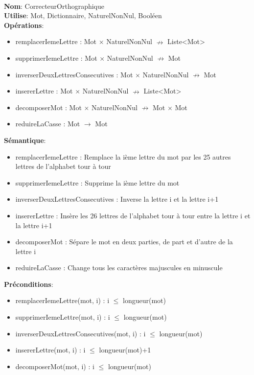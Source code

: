\documentclass{article}
\begin{document}
    \noindent
    \\
    \textbf{Nom}: CorrecteurOrthographique \\
    \textbf{Utilise}: Mot, Dictionnaire, NaturelNonNul, Booléen\\
    \textbf{Opérations}: \begin{itemize}[label=$\ $, leftmargin=2cm, itemsep=0cm]
        \item remplacerIemeLettre : Mot $\times$ NaturelNonNul $\nrightarrow$ Liste\textless Mot\textgreater
        \item supprimerIemeLettre : Mot $\times$ NaturelNonNul $\nrightarrow$ Mot
        \item inverserDeuxLettresConsecutives : Mot $\times$ NaturelNonNul $\nrightarrow$ Mot
        \item insererLettre : Mot $\times$ NaturelNonNul $\nrightarrow$ Liste\textless Mot\textgreater
        \item decomposerMot : Mot $\times$ NaturelNonNul $\nrightarrow$ Mot $\times$ Mot
        \item reduireLaCasse : Mot $\rightarrow$ Mot
    \end{itemize}
    
    \textbf{Sémantique}: \begin{itemize}[label=$\- $, leftmargin=2cm, itemsep=0cm]
        \item remplacerIemeLettre : Remplace la ième lettre du mot par les 25 autres lettres de l'alphabet tour à tour
        \item supprimerIemeLettre : Supprime la ième lettre du mot
        \item inverserDeuxLettresConsecutives : Inverse la lettre i et la lettre i+1
        \item insererLettre : Insère les 26 lettres de l'alphabet tour à tour entre la lettre i et la lettre i+1
        \item decomposerMot : Sépare le mot en deux parties, de part et d'autre de la lettre i
        \item reduireLaCasse : Change tous les caractères majuscules en minuscule
    \end{itemize}

    \textbf{Préconditions}: \begin{itemize}[label=$\- $, leftmargin=2cm, itemsep=0cm]
        \item remplacerIemeLettre(mot, i) : i $\leq$ longueur(mot)
        \item supprimerIemeLettre(mot, i) : i $\leq$ longueur(mot)
        \item inverserDeuxLettresConsecutives(mot, i) : i $\leq$ longueur(mot)
        \item insererLettre(mot, i) : i $\leq$ longueur(mot)+1
        \item decomposerMot(mot, i) : i $\leq$ longueur(mot)
    \end{itemize}
\end{document}
